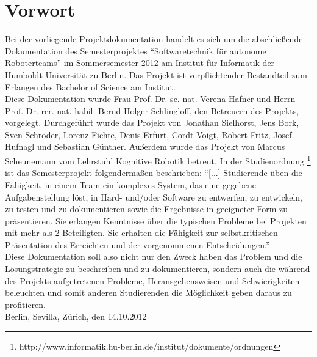 \chapter{Vorwort}\label{Vorwort}

Bei der vorliegende Projektdokumentation handelt es sich um die abschließende Dokumentation des Semesterprojektes ``Softwaretechnik für autonome Roboterteams'' im Sommersemester 2012 am Institut für Informatik der Humboldt-Universität zu Berlin. Das Projekt ist verpflichtender Bestandteil zum Erlangen des Bachelor of Science am Institut.\\
Diese Dokumentation wurde Frau Prof. Dr. sc. nat. Verena Hafner und Herrn Prof. Dr. rer. nat. habil. Bernd-Holger Schlingloff, den Betreuern des Projekts, vorgelegt. Durchgeführt wurde das Projekt von Jonathan Sielhorst, Jens Bork, Sven Schröder, Lorenz Fichte, Denis Erfurt, Cordt Voigt, Robert Fritz, Josef Hufnagl und Sebastian Günther. Außerdem wurde das Projekt von Marcus Scheunemann vom Lehrstuhl Kognitive Robotik betreut.
In der Studienordnung \footnote{http://www.informatik.hu-berlin.de/institut/dokumente/ordnungen} ist das Semesterprojekt folgendermaßen beschrieben: ``[...] Studierende üben die Fähigkeit, in einem Team ein komplexes System, das eine gegebene Aufgabenstellung löst, in Hard- und/oder Software zu entwerfen, zu entwickeln, zu testen und zu dokumentieren sowie die Ergebnisse in geeigneter Form zu präsentieren. Sie erlangen Kenntnisse über die typischen Probleme bei Projekten mit mehr als 2 Beteiligten. Sie erhalten die Fähigkeit zur selbstkritischen Präsentation des Erreichten und der vorgenommenen Entscheidungen.''\\
Diese Dokumentation soll also nicht nur den Zweck haben das Problem und die Lösungstrategie zu beschreiben und zu  dokumentieren, sondern auch die während des Projekts aufgetretenen Probleme, Heransgehensweisen und Schwierigkeiten beleuchten und somit anderen Studierenden die Möglichkeit geben daraus zu profitieren.
\\
Berlin, Sevilla, Zürich, den 14.10.2012